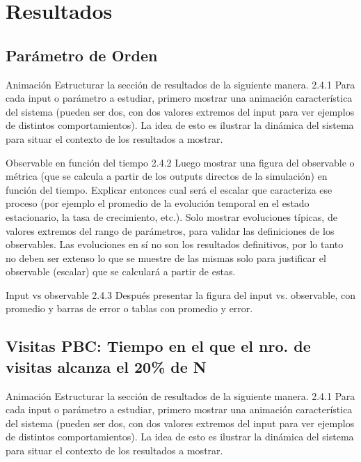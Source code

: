 \documentclass{beamer}
\begin{document}
    \section{Resultados}

    \subsection[Parámetro de Orden]{Parámetro de Orden}

    \begin{frame}{Animación}
        Estructurar la sección de resultados de la siguiente manera.
        2.4.1 Para cada input o parámetro a estudiar, primero mostrar una animación característica del
        sistema (pueden ser dos, con dos valores extremos del input para ver ejemplos de distintos
        comportamientos). La idea de esto es ilustrar la dinámica del sistema para situar el contexto de los
        resultados a mostrar.
    \end{frame}

    \begin{frame}{Observable en función del tiempo}
        2.4.2 Luego mostrar una figura del observable o métrica (que se calcula a partir de los outputs
        directos de la simulación) en función del tiempo. Explicar entonces cual será el escalar que
        caracteriza ese proceso (por ejemplo el promedio de la evolución temporal en el estado
        estacionario, la tasa de crecimiento, etc.). Solo mostrar evoluciones típicas, de valores extremos
        del rango de parámetros, para validar las definiciones de los observables. Las evoluciones en sí
        no son los resultados definitivos, por lo tanto no deben ser extenso lo que se muestre de las
        mismas solo para justificar el observable (escalar) que se calculará a partir de estas.
    \end{frame}

    \begin{frame}{Input vs observable}
        2.4.3 Después presentar la figura del input vs. observable, con promedio y barras de error o tablas
        con promedio y error.
    \end{frame}

    \subsection[Visitas PBC]{Visitas PBC: Tiempo en el que el nro. de visitas alcanza el 20\% de N}

    \begin{frame}{Animación}
        Estructurar la sección de resultados de la siguiente manera.
        2.4.1 Para cada input o parámetro a estudiar, primero mostrar una animación característica del
        sistema (pueden ser dos, con dos valores extremos del input para ver ejemplos de distintos
        comportamientos). La idea de esto es ilustrar la dinámica del sistema para situar el contexto de los
        resultados a mostrar.
    \end{frame}
\end{document}
